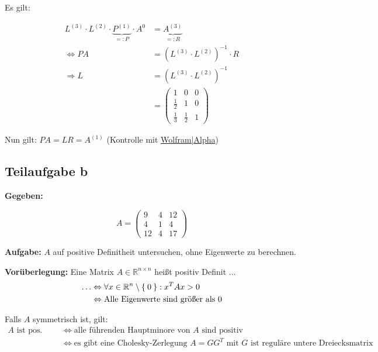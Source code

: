 Es gilt:

\begin{align}
	L^{(3)} \cdot L^{(2)} \cdot \underbrace{P^{(1)}}_{=: P} \cdot A^{0} &= \underbrace{A^{(3)}}_{=: R}\\
	\Leftrightarrow P A &= (L^{(3)} \cdot L^{(2)})^{-1} \cdot R \\
	\Rightarrow L &= (L^{(3)} \cdot L^{(2)})^{-1}\\
	&= \begin{pmatrix}
		1 & 0 & 0\\
		\frac{1}{2} & 1 & 0\\
		\frac{1}{3} & \frac{1}{2} & 1
	\end{pmatrix}
\end{align}

Nun gilt: $P A = L R = A^{(1)}$ (Kontrolle mit \href{http://www.wolframalpha.com/input/?i=%7B%7B1%2C0%2C0%7D%2C%7B0.5%2C1%2C0%7D%2C%7B1%2F3%2C0.5%2C1%7D%7D*%7B%7B6%2C6%2C6%7D%2C%7B0%2C12%2C10%7D%2C%7B0%2C0%2C12%7D%7D}{Wolfram|Alpha})

\subsection*{Teilaufgabe b}

\textbf{Gegeben:}

\[A = 
\begin{pmatrix}
    9 & 4 & 12 \\
    4 & 1  & 4 \\
   12 & 4  & 17
\end{pmatrix}\]

\textbf{Aufgabe:} $A$ auf positive Definitheit untersuchen, ohne Eigenwerte zu berechnen.

\textbf{Vorüberlegung:}
Eine Matrix $A \in \mathbb{R}^{n \times n}$ heißt positiv Definit $\dots$
\begin{align*}
  \dots & \Leftrightarrow \forall x \in \mathbb{R}^n \setminus \Set{0}: x^T A x > 0\\
	& \Leftrightarrow \text{Alle Eigenwerte sind größer als 0}
\end{align*}

Falls $A$ symmetrisch ist, gilt:
\begin{align*}
 \text{$A$ ist pos. Definit} & \Leftrightarrow \text{alle führenden Hauptminore von $A$ sind positiv}\\
	& \Leftrightarrow \text{es gibt eine Cholesky-Zerlegung $A=GG^T$ mit $G$ ist reguläre untere Dreiecksmatrix}\\
\end{align*}

